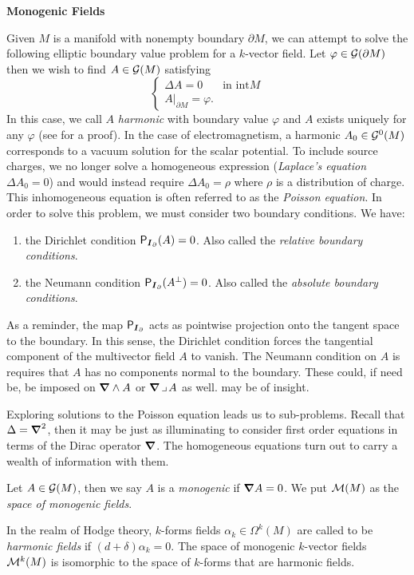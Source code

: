 \documentclass{article}
\begin{document}
\noindent \textbf{Monogenic Fields}

Given $M$ is a manifold with nonempty boundary $\partial M$, we can attempt to solve the following elliptic  boundary value problem for a $k$-vector field. Let $\varphi \in \mathcal{G}(\partial M)$ then we wish to find $A \in \mathcal{G}(M)$ satisfying
\begin{equation}
    \label{eq:dirichlet_problem}
    \begin{cases}
    \Delta A = 0 & \textrm{in $\mathrm{int} M$}\\
    A\vert_{\partial M} = \varphi.
    \end{cases}
\end{equation}
In this case, we call $A$ \emph{harmonic} with boundary value $\varphi$ and $A$ exists uniquely for any $\varphi$ (see \cite[Theorem 3.4.6]{schwarz_hodge_1995} for a proof). In the case of electromagnetism, a harmonic $A_0 \in \mathcal{G}^0(M)$ corresponds to a vacuum solution for the scalar potential. To include source charges, we no longer solve a homogeneous expression (\emph{Laplace's equation} $\Delta A_0 = 0$) and would instead require $\Delta A_0 = \rho$ where $\rho$ is a distribution of charge. This inhomogeneous equation is often referred to as the \emph{Poisson equation}. In order to solve this problem, we must consider two boundary conditions. We have:
\begin{enumerate}[1.]
    \item the Dirichlet condition $\mathsf{P}_{\boldsymbol{I}_{\partial}}(A)=0$. Also called the \emph{relative boundary conditions}.
    \item the Neumann condition $\mathsf{P}_{\boldsymbol{I}_\partial}(A^\perp)=0$. Also called the \emph{absolute boundary conditions}.
\end{enumerate}
As a reminder, the map $\mathsf{P}_{\boldsymbol{I}_\partial}$ acts as pointwise projection onto the tangent space to the boundary. In this sense, the Dirichlet condition forces the tangential component of the multivector field $A$ to vanish. The Neumann condition on $A$ is requires that $A$ has no components normal to the boundary. These could, if need be, be imposed on $\boldsymbol{\nabla} \wedge A$ or $\boldsymbol{\nabla} \hspace*{.5mm}\lrcorner \hspace*{.5mm} A$ as well. \cite[Proposition 1.2.6]{schwarz_hodge_1995} may be of insight.

Exploring solutions to the Poisson equation leads us to sub-problems. Recall that $\Delta = \boldsymbol{\nabla}^2$, then it may be just as illuminating to consider first order equations in terms of the Dirac operator $\boldsymbol{\nabla}$. The homogeneous equations turn out to carry a wealth of information with them.
\begin{definition}
Let $A \in \mathcal{G}(M)$, then we say $A$ is a \emph{monogenic} if $\boldsymbol{\nabla} A = 0$. We put $\mathcal{M}(M)$ as the \emph{space of monogenic fields}.
\end{definition}
In the realm of Hodge theory, $k$-forms fields $\alpha_k \in \Omega^k(M)$ are called to be \emph{harmonic fields} if $(d+\delta)\alpha_k = 0$. The space of monogenic $k$-vector fields $\mathcal{M}^k(M)$ is isomorphic to the space of $k$-forms that are harmonic fields. 
\end{document}
